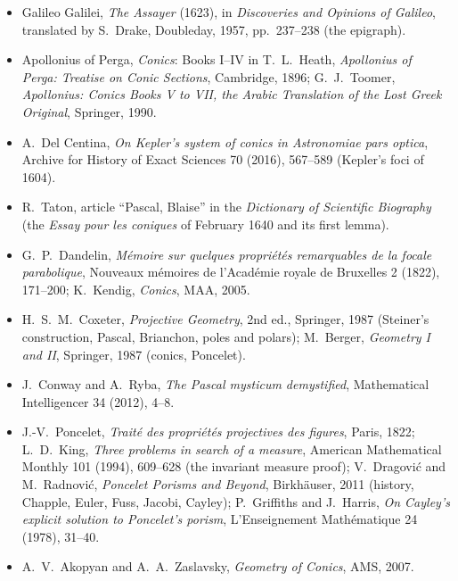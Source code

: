 \begin{itemize}
\item Galileo Galilei, \emph{The Assayer} (1623), in \emph{Discoveries and Opinions of Galileo}, translated by S.~Drake, Doubleday, 1957, pp.~237--238
(the epigraph).
\item Apollonius of Perga, \emph{Conics}: Books I--IV in T.~L.~Heath, \emph{Apollonius of Perga: Treatise on Conic Sections}, Cambridge, 1896;
G.~J.~Toomer, \emph{Apollonius: Conics Books V to VII, the Arabic Translation of the Lost Greek Original}, Springer, 1990.
\item A.~Del Centina, \emph{On Kepler's system of conics in Astronomiae pars optica}, Archive for History of Exact Sciences 70 (2016), 567--589 (Kepler's
foci of 1604).
\item R.~Taton, article ``Pascal, Blaise'' in the \emph{Dictionary of Scientific Biography} (the \emph{Essay pour les coniques} of February 1640 and its
first lemma).
\item G.~P.~Dandelin, \emph{M\'emoire sur quelques propri\'et\'es remarquables de la focale parabolique}, Nouveaux m\'emoires de l'Acad\'emie royale de
Bruxelles 2 (1822), 171--200; K.~Kendig, \emph{Conics}, MAA, 2005.
\item H.~S.~M.~Coxeter, \emph{Projective Geometry}, 2nd ed., Springer, 1987 (Steiner's construction, Pascal, Brianchon, poles and polars);
M.~Berger, \emph{Geometry I and II}, Springer, 1987 (conics, Poncelet).
\item J.~Conway and A.~Ryba, \emph{The Pascal mysticum demystified}, Mathematical Intelligencer 34 (2012), 4--8.
\item J.-V.~Poncelet, \emph{Trait\'e des propri\'et\'es projectives des figures}, Paris, 1822; L.~D.~King, \emph{Three problems in search of a
measure}, American Mathematical Monthly 101 (1994), 609--628 (the invariant measure proof); V.~Dragovi\'c and M.~Radnovi\'c, \emph{Poncelet Porisms and
Beyond}, Birkh\"auser, 2011 (history, Chapple, Euler, Fuss, Jacobi, Cayley); P.~Griffiths and J.~Harris, \emph{On Cayley's explicit solution to
Poncelet's porism}, L'Enseignement Math\'ematique 24 (1978), 31--40.
\item A.~V.~Akopyan and A.~A.~Zaslavsky, \emph{Geometry of Conics}, AMS, 2007.
\end{itemize}
